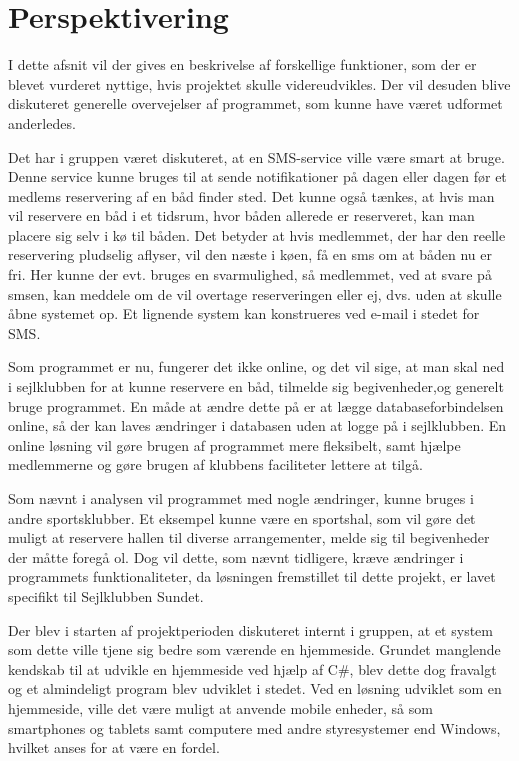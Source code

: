 \chapter{Perspektivering}

I dette afsnit vil der gives en beskrivelse af forskellige funktioner, som der er blevet vurderet nyttige, hvis projektet skulle videreudvikles. 
Der vil desuden blive diskuteret generelle overvejelser af programmet, som kunne have været udformet anderledes. 

Det har i gruppen været diskuteret, at en SMS-service ville være smart at bruge. 
Denne service kunne bruges til at sende notifikationer på dagen eller dagen før et medlems reservering af en båd finder sted. 
Det kunne også tænkes, at hvis man vil reservere en båd i et tidsrum, hvor båden allerede er reserveret, kan man placere sig selv i kø til båden.
Det betyder at hvis medlemmet, der har den reelle reservering pludselig aflyser, vil den næste i køen, få en sms om at båden nu er fri.
Her kunne der evt. bruges en svarmulighed, så medlemmet, ved at svare på smsen, kan meddele om de vil overtage reserveringen eller ej, dvs. uden at skulle åbne systemet op. 
Et lignende system kan konstrueres ved e-mail i stedet for SMS.

Som programmet er nu, fungerer det ikke online, og det vil sige, at man skal ned i sejlklubben for at kunne reservere en båd, tilmelde sig begivenheder,og generelt bruge programmet. 
En måde at ændre dette på er at lægge databaseforbindelsen online, så der kan laves ændringer i databasen uden at logge på i sejlklubben. 
En online løsning vil gøre brugen af programmet mere fleksibelt, samt hjælpe medlemmerne og gøre brugen af klubbens faciliteter lettere at tilgå.

Som nævnt i analysen vil programmet med nogle ændringer, kunne bruges i andre sportsklubber. 
Et eksempel kunne være en sportshal, som vil gøre det muligt at reservere hallen til diverse arrangementer, melde sig til begivenheder der måtte foregå ol. 
Dog vil dette, som nævnt tidligere, kræve ændringer i programmets funktionaliteter, da løsningen fremstillet til dette projekt, er lavet specifikt til Sejlklubben Sundet.

Der blev i starten af projektperioden diskuteret internt i gruppen, at et system som dette ville tjene sig bedre som værende en hjemmeside.
Grundet manglende kendskab til at udvikle en hjemmeside ved hjælp af C\#, blev dette dog fravalgt og et almindeligt program blev udviklet i stedet. 
Ved en løsning udviklet som en hjemmeside, ville det være muligt at anvende mobile enheder, så som smartphones og tablets samt computere med andre styresystemer end Windows, hvilket anses for at være en fordel.  
